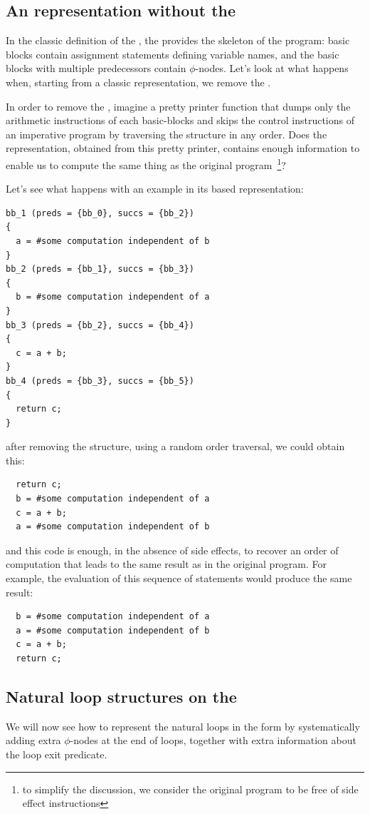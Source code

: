\subsection{An \SSA{} representation without the \CFG{}}

In the classic definition of the \SSA{}, the \CFG{} provides the
skeleton of the program: basic blocks contain assignment statements
defining \SSA{} variable names, and the basic blocks with multiple
predecessors contain $\phi$-nodes.  Let's look at what happens when,
starting from a classic \SSA{} representation, we remove the \CFG{}.

In order to remove the \CFG{}, imagine a pretty printer function that dumps only the arithmetic instructions of each basic-blocks and skips the control instructions of an imperative program by traversing the \CFG{} structure in any order.  Does the representation, obtained from
this pretty printer, contains enough information to enable us to
compute the same thing as the original program~\footnote{to simplify the discussion, we consider the original program to be free of side effect instructions}?

Let's see what happens with an example in its \CFG{} based \SSA{} representation:
\begin{verbatim}
bb_1 (preds = {bb_0}, succs = {bb_2})
{
  a = #some computation independent of b
}
bb_2 (preds = {bb_1}, succs = {bb_3})
{
  b = #some computation independent of a
}
bb_3 (preds = {bb_2}, succs = {bb_4})
{
  c = a + b;
}
bb_4 (preds = {bb_3}, succs = {bb_5})
{
  return c;
}
\end{verbatim}
after removing the \CFG{} structure, using a random order traversal,
we could obtain this:
\begin{verbatim}
  return c;
  b = #some computation independent of a
  c = a + b;
  a = #some computation independent of b
\end{verbatim}
and this \SSA{} code is enough, in the absence of side effects, to
recover an order of computation that leads to the same result as in
the original program.  For example, the evaluation of this sequence of
statements would produce the same result:
\begin{verbatim}
  b = #some computation independent of a
  a = #some computation independent of b
  c = a + b;
  return c;
\end{verbatim}

\subsection{Natural loop structures on the \SSA{}}
We will now see how to represent the natural loops in the \SSA{} form
by systematically adding extra $\phi$-nodes at the end of loops, together
with extra information about the loop exit predicate.

